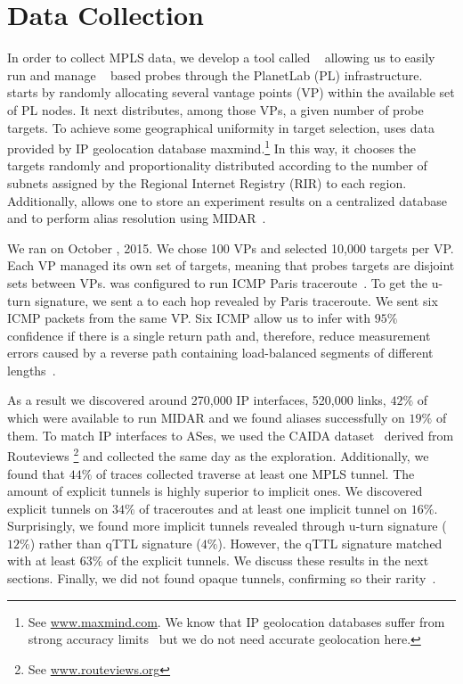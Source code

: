 \section{Data Collection}\label{dataset}
In order to collect MPLS data, we develop a tool called
\magallanes~\cite{magallanes}  allowing us to easily run and manage
\scamper~\cite{Luckie10} based probes through the PlanetLab (PL) infrastructure.
\magallanes starts by randomly allocating several vantage points (VP) within the
available set of PL nodes.  It next distributes, among those VPs, a given number
of probe targets. To achieve some geographical uniformity in target selection,
\magallanes uses data provided by IP geolocation database maxmind.\footnote{See
\url{www.maxmind.com}.  We know that IP geolocation databases suffer from strong
accuracy limits~\cite{geolocation} but we do not need accurate geolocation
here.}  In this way, it chooses the targets randomly and proportionality
distributed according to the number of subnets assigned by the Regional Internet
Registry (RIR) to each region. Additionally, \magallanes allows one to store an 
experiment results on a centralized database and to perform alias resolution
using MIDAR~\cite{Keys13}.

We ran \magallanes on October , 2015.  We chose 100 VPs and selected
10,000 targets per VP.  Each VP managed its own set of targets, meaning that
probes targets are disjoint sets between VPs.  \scamper was configured to run
ICMP Paris traceroute~\cite{BRICE06}.  To get the u-turn signature, we sent a
\ping to each hop revealed by Paris traceroute. We sent six ICMP \echorequest
packets from the same VP.  Six ICMP \echoreply allow us to infer with $95\%$
confidence if there is a single return path and, therefore, reduce measurement
errors caused by a reverse path containing load-balanced segments of different
lengths~\cite{BRICE07}.

As a result we discovered around 270,000 IP interfaces,  520,000 links, $42\%$
of which were available to run MIDAR and we found aliases successfully on $19\%$
of them. To match IP interfaces to ASes, we used the CAIDA
dataset~\cite{caida_ref} derived from Routeviews \footnote{See
\url{www.routeviews.org}} and collected the same day as the exploration.
Additionally, we found that $44\%$ of traces collected traverse at least one
MPLS tunnel.  The amount of explicit tunnels is highly superior to implicit
ones. We discovered explicit tunnels on $34\%$ of traceroutes and at least one
implicit tunnel on $16\%$. Surprisingly, we found more implicit tunnels revealed
through u-turn signature ($12\%$) rather than qTTL signature ($4\%$). However,
the qTTL signature matched with at least $63\%$ of the explicit tunnels. We
discuss these results in the next sections. Finally, we did not found opaque
tunnels, confirming so their rarity~\cite{VAN2013}.
